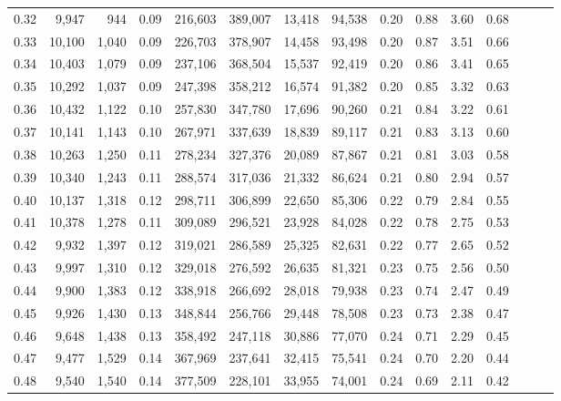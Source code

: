\begin{tabular}{rrrrrrrrrrrrrrr}
0.32 &   9,947 &    944 &  0.09 &  216,603 &  389,007 &   13,418 &   94,538 &  0.20 &  0.88 &  3.60 &      0.68 \\
0.33 &  10,100 &  1,040 &  0.09 &  226,703 &  378,907 &   14,458 &   93,498 &  0.20 &  0.87 &  3.51 &      0.66 \\
0.34 &  10,403 &  1,079 &  0.09 &  237,106 &  368,504 &   15,537 &   92,419 &  0.20 &  0.86 &  3.41 &      0.65 \\
0.35 &  10,292 &  1,037 &  0.09 &  247,398 &  358,212 &   16,574 &   91,382 &  0.20 &  0.85 &  3.32 &      0.63 \\
0.36 &  10,432 &  1,122 &  0.10 &  257,830 &  347,780 &   17,696 &   90,260 &  0.21 &  0.84 &  3.22 &      0.61 \\
0.37 &  10,141 &  1,143 &  0.10 &  267,971 &  337,639 &   18,839 &   89,117 &  0.21 &  0.83 &  3.13 &      0.60 \\
0.38 &  10,263 &  1,250 &  0.11 &  278,234 &  327,376 &   20,089 &   87,867 &  0.21 &  0.81 &  3.03 &      0.58 \\
0.39 &  10,340 &  1,243 &  0.11 &  288,574 &  317,036 &   21,332 &   86,624 &  0.21 &  0.80 &  2.94 &      0.57 \\
0.40 &  10,137 &  1,318 &  0.12 &  298,711 &  306,899 &   22,650 &   85,306 &  0.22 &  0.79 &  2.84 &      0.55 \\
0.41 &  10,378 &  1,278 &  0.11 &  309,089 &  296,521 &   23,928 &   84,028 &  0.22 &  0.78 &  2.75 &      0.53 \\
0.42 &   9,932 &  1,397 &  0.12 &  319,021 &  286,589 &   25,325 &   82,631 &  0.22 &  0.77 &  2.65 &      0.52 \\
0.43 &   9,997 &  1,310 &  0.12 &  329,018 &  276,592 &   26,635 &   81,321 &  0.23 &  0.75 &  2.56 &      0.50 \\
0.44 &   9,900 &  1,383 &  0.12 &  338,918 &  266,692 &   28,018 &   79,938 &  0.23 &  0.74 &  2.47 &      0.49 \\
0.45 &   9,926 &  1,430 &  0.13 &  348,844 &  256,766 &   29,448 &   78,508 &  0.23 &  0.73 &  2.38 &      0.47 \\
0.46 &   9,648 &  1,438 &  0.13 &  358,492 &  247,118 &   30,886 &   77,070 &  0.24 &  0.71 &  2.29 &      0.45 \\
0.47 &   9,477 &  1,529 &  0.14 &  367,969 &  237,641 &   32,415 &   75,541 &  0.24 &  0.70 &  2.20 &      0.44 \\
0.48 &   9,540 &  1,540 &  0.14 &  377,509 &  228,101 &   33,955 &   74,001 &  0.24 &  0.69 &  2.11 &      0.42 \\

\end{tabular}
